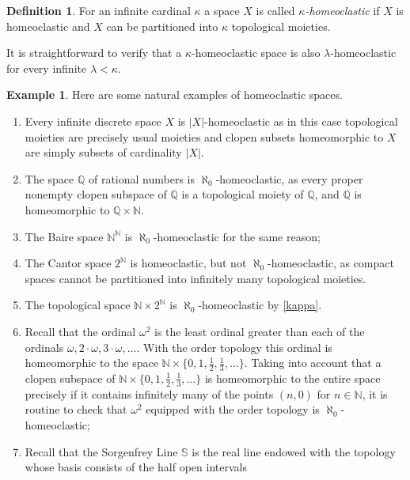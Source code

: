 \documentclass[11pt]{amsart}
\theoremstyle{definition}
\newtheorem{definition}[theorem]{Definition}
\newtheorem{example}[theorem]{Example}
\newcommand{\N}{\mathbb N}
\newcommand{\Q}{\mathbb Q}
\newcommand{\w}{\omega}
\begin{document}
\begin{definition}\label{def:kappaclast}
  For an infinite cardinal $\kappa$ a space $X$ is called {\em $\kappa$-homeoclastic} if $X$ is homeoclastic and $X$  can be partitioned into \(\kappa\) topological moieties.
\end{definition}

It is straightforward to verify that a $\kappa$-homeoclastic space is also $\lambda$-homeoclastic for every infinite $\lambda<\kappa$.


\begin{example}\label{example}
    Here are some natural examples of homeoclastic spaces. 
    \begin{enumerate}[\rm(i)]
        \item Every infinite discrete space \(X\) is \(|X|\)-homeoclastic as in this case topological moieties are precisely usual moieties and clopen subsets homeomorphic to \(X\) are simply subsets of cardinality \(|X|\).
        \item The space $\Q$ of rational numbers is \(\aleph_0\)-homeoclastic, as every proper nonempty clopen subspace of \(\Q\) is a topological moiety of \(\Q\), and \(\Q \) is homeomorphic to \(\Q \times \N\).
    \item The Baire space \(\N^\N\) is \(\aleph_0\)-homeoclastic for the same reason;
    \item The Cantor space \(2^{\N}\) is homeoclastic, but not \(\aleph_0\)-homeoclastic, as compact spaces cannot be partitioned into infinitely many topological moieties. 
    \item The topological space \(\N \times 2^{\N}\) is \(\aleph_0\)-homeoclastic by \cref{kappa}. 
  \item Recall that the ordinal \(\omega^2\) is the least ordinal greater than each of the ordinals \(\omega, 2\cdot \omega, 3\cdot \omega,\ldots\). With the order topology this ordinal is homeomorphic to the space \(\N \times \{0,1,\frac{1}{2},\frac{1}{3},\ldots\}\). Taking into account that a clopen subspace of \(\N \times \{0,1,\frac{1}{2},\frac{1}{3},\ldots\}\) is homeomorphic to the entire space precisely if it contains infinitely many of the points \((n,0)\) for \(n\in \N\),  it is routine to check that $\w^2$ equipped with the order topology is \(\aleph_0\)-homeoclastic;
  \item Recall that the Sorgenfrey Line \(\mathbb{S}\) is the real line endowed with the topology whose basis consists of the half open intervals

\end{enumerate}
\end{example}
\end{document}
